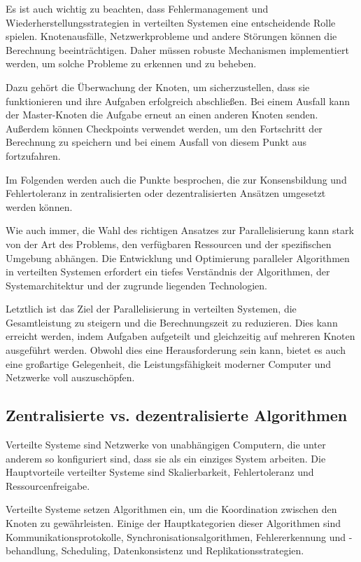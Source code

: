 Es ist auch wichtig zu beachten, dass Fehlermanagement und Wiederherstellungsstrategien in verteilten Systemen eine entscheidende Rolle spielen. Knotenausfälle, Netzwerkprobleme und andere Störungen können die Berechnung beeinträchtigen. Daher müssen robuste Mechanismen implementiert werden, um solche Probleme zu erkennen und zu beheben.

Dazu gehört die Überwachung der Knoten, um sicherzustellen, dass sie funktionieren und ihre Aufgaben erfolgreich abschließen. Bei einem Ausfall kann der Master-Knoten die Aufgabe erneut an einen anderen Knoten senden. Außerdem können Checkpoints verwendet werden, um den Fortschritt der Berechnung zu speichern und bei einem Ausfall von diesem Punkt aus fortzufahren.

Im Folgenden werden auch die Punkte besprochen, die zur Konsensbildung und Fehlertoleranz in zentralisierten oder dezentralisierten Ansätzen umgesetzt werden können.

Wie auch immer, die Wahl des richtigen Ansatzes zur Parallelisierung kann stark von der Art des Problems, den verfügbaren Ressourcen und der spezifischen Umgebung abhängen. Die Entwicklung und Optimierung paralleler Algorithmen in verteilten Systemen erfordert ein tiefes Verständnis der Algorithmen, der Systemarchitektur und der zugrunde liegenden Technologien.

Letztlich ist das Ziel der Parallelisierung in verteilten Systemen, die Gesamtleistung zu steigern und die Berechnungszeit zu reduzieren. Dies kann erreicht werden, indem Aufgaben aufgeteilt und gleichzeitig auf mehreren Knoten ausgeführt werden. Obwohl dies eine Herausforderung sein kann, bietet es auch eine großartige Gelegenheit, die Leistungsfähigkeit moderner Computer und Netzwerke voll auszuschöpfen.


\subsection{Zentralisierte vs. dezentralisierte Algorithmen}

Verteilte Systeme sind Netzwerke von unabhängigen Computern, die unter anderem so konfiguriert sind, dass sie als ein einziges System arbeiten. Die Hauptvorteile verteilter Systeme sind Skalierbarkeit, Fehlertoleranz und Ressourcenfreigabe.

Verteilte Systeme setzen Algorithmen ein, um die Koordination zwischen den Knoten zu gewährleisten. Einige der Hauptkategorien dieser Algorithmen sind Kommunikationsprotokolle, Synchronisationsalgorithmen, Fehlererkennung und -behandlung, Scheduling, Datenkonsistenz und Replikationsstrategien.

